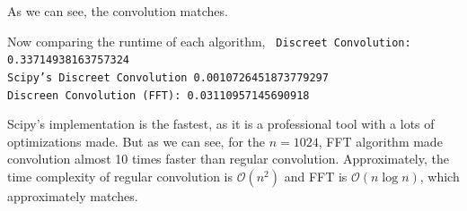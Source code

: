 As we can see, the convolution matches. 


Now comparing the runtime of each algorithm,
\texttt{
Discreet Convolution:  0.33714938163757324\\
Scipy's Discreet Convolution 0.0010726451873779297\\
Discreen Convolution (FFT):  0.03110957145690918\\
}

Scipy's implementation is the fastest, as it is a professional tool with a lots of optimizations made. But as we can see, for the $n=1024$, FFT algorithm made convolution almost 10 times faster than regular convolution. Approximately, the time complexity of regular convolution is $\mathcal{O}(n^2)$ and FFT is $\mathcal{O}(n\log n)$, which  approximately matches.



	     
